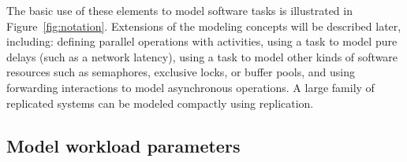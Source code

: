 \documentclass[11pt]{article}
\begin{document}
The basic use of these elements to model software tasks is illustrated in Figure~\ref{fig:notation}. Extensions of the
modeling concepts will be described later, including: defining parallel operations with activities,
using a task to model pure delays (such as a network latency), using a task to model other kinds of
software resources such as semaphores, exclusive locks, or buffer pools, and using forwarding
interactions to model asynchronous operations. A large family of replicated systems can be modeled
compactly using replication.

\subsection{Model workload parameters}
\end{document}
